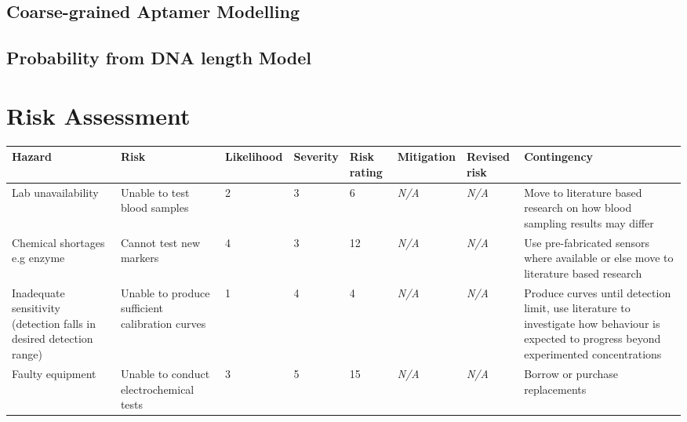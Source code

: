 \begin{appendices}
\subsection{Coarse-grained Aptamer Modelling}

\newpage
\subsection{Probability from DNA length Model}

\newpage

\section{Risk Assessment}
    \begin{longtable}{|p{}|p{}|p{}|p{}|p{}|p{}|p{}|p{}|}\hline
        \textbf{Hazard} & \textbf{Risk} & \textbf{Likelihood} & \textbf{Severity} & \textbf{Risk rating} & \textbf{Mitigation} & \textbf{Revised risk} & \textbf{Contingency }\\ \hline
        
        Lab unavailability & Unable to test blood samples & 2 & 3 & 6 & \textit{N/A} & \textit{N/A} & Move to literature based research on how blood sampling results may differ \\ \hline
        
        Chemical shortages e.g enzyme & Cannot test new markers & 4 & 3 & 12 & \textit{N/A} & \textit{N/A} & Use pre-fabricated sensors where available or else move to literature based research \\ \hline
        
        Inadequate sensitivity (detection falls in desired detection range) & Unable to produce sufficient calibration curves & 1 & 4 & 4 & \textit{N/A} & \textit{N/A} & Produce curves until detection limit, use literature to investigate how behaviour is expected to progress beyond experimented concentrations \\ \hline
        
        Faulty equipment & Unable to conduct electrochemical tests & 3 & 5 & 15 & \textit{N/A} & \textit{N/A} & Borrow or purchase replacements\\ \hline
        

\end{longtable}
\end{appendices}
